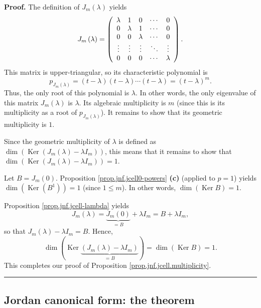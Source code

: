 \documentclass[numbers=enddot,12pt,final,onecolumn,notitlepage]{scrartcl}%
\numberwithin{exer}{subsection}
\theoremstyle{definition}
\newenvironment{proof}[1][Proof]{\noindent\textbf{#1.} }{\ \rule{0.5em}{0.5em}}
\begin{document}
\begin{proof}
The definition of $J_{m}\left(  \lambda\right)  $ yields%
\[
J_{m}\left(  \lambda\right)  =\left(
\begin{array}
[c]{ccccc}%
\lambda & 1 & 0 & \cdots & 0\\
0 & \lambda & 1 & \cdots & 0\\
0 & 0 & \lambda & \cdots & 0\\
\vdots & \vdots & \vdots & \ddots & \vdots\\
0 & 0 & 0 & \cdots & \lambda
\end{array}
\right)  .
\]
This matrix is upper-triangular, so its characteristic polynomial is%
\[
p_{J_{m}\left(  \lambda\right)  }=\left(  t-\lambda\right)  \left(
t-\lambda\right)  \cdots\left(  t-\lambda\right)  =\left(  t-\lambda\right)
^{m}.
\]
Thus, the only root of this polynomial is $\lambda$. In other words, the only
eigenvalue of this matrix $J_{m}\left(  \lambda\right)  $ is $\lambda$. Its
algebraic multiplicity is $m$ (since this is its multiplicity as a root of
$p_{J_{m}\left(  \lambda\right)  }$). It remains to show that its geometric
multiplicity is $1$.

Since the geometric multiplicity of $\lambda$ is defined as $\dim\left(
\operatorname*{Ker}\left(  J_{m}\left(  \lambda\right)  -\lambda I_{m}\right)
\right)  $, this means that it remains to show that $\dim\left(
\operatorname*{Ker}\left(  J_{m}\left(  \lambda\right)  -\lambda I_{m}\right)
\right)  =1$.

Let $B=J_{m}\left(  0\right)  $. Proposition \ref{prop.jnf.jcell0-powers}
\textbf{(c)} (applied to $p=1$) yields $\dim\left(  \operatorname*{Ker}\left(
B^{1}\right)  \right)  =1$ (since $1\leq m$). In other words, $\dim\left(
\operatorname*{Ker}B\right)  =1$.

Proposition \ref{prop.jnf.jcell-lambda} yields%
\[
J_{m}\left(  \lambda\right)  =\underbrace{J_{m}\left(  0\right)  }%
_{=B}+\lambda I_{m}=B+\lambda I_{m},
\]
so that $J_{m}\left(  \lambda\right)  -\lambda I_{m}=B$. Hence,
\[
\dim\left(  \operatorname*{Ker}\underbrace{\left(  J_{m}\left(  \lambda
\right)  -\lambda I_{m}\right)  }_{=B}\right)  =\dim\left(
\operatorname*{Ker}B\right)  =1.
\]
This completes our proof of Proposition \ref{prop.jnf.jcell.multiplicity}.
\end{proof}

\subsection{Jordan canonical form: the theorem}
\end{document}
